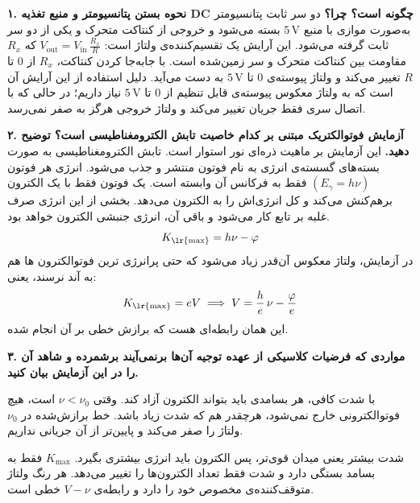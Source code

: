
\noindent\textbf{۱. نحوه بستن پتانسیومتر و منبع تغذیه DC چگونه است؟ چرا؟}
\newline
دو سر ثابت پتانسیومتر به‌صورت موازی با منبع $5\,\mathrm{V}$ بسته می‌شود و
خروجی از کنتاکت متحرک و یکی از دو سر ثابت گرفته می‌شود. این آرایش یک
تقسیم‌کننده‌ی ولتاژ است:
\(V_{\mathrm{out}} = V_{\mathrm{in}}\,\frac{R_x}{R}\)
\newline
که $R_x$ مقاومت بین کنتاکت متحرک و سر زمین‌شده است. با جابه‌جا کردن کنتاکت،
$R_x$ از $0$ تا $R$ تغییر می‌کند و ولتاژ پیوسته‌ی $0$ تا $5\,\mathrm{V}$
به دست می‌آید.
دلیل استفاده از این آرایش آن است که به ولتاژ معکوس پیوسته‌ی قابل تنظیم از
$0$ تا $5\,\mathrm{V}$ نیاز داریم؛ در حالی که با اتصال سری فقط جریان
تغییر می‌کند و ولتاژ خروجی هرگز به صفر نمی‌رسد.

\khat

\noindent\textbf{۲. آزمایش فوتوالکتریک مبتنی بر کدام خاصیت تابش الکترومغناطیسی است؟ توضیح دهید.}
\newline
این آزمایش بر ماهیت ذره‌ای نور استوار است.
تابش الکترومغناطیسی به صورت بسته‌های گسسته‌ی انرژی به نام فوتون منتشر و جذب می‌شود.
انرژی هر فوتون
\((E_{\gamma} = h\nu)\)
فقط به فرکانس آن وابسته است.
\newline
یک فوتون فقط با یک الکترون برهم‌کنش می‌کند و کل انرژی‌اش را به الکترون می‌دهد.
بخشی از این انرژی صرف غلبه بر تابع کار می‌شود و باقی آن، انرژی جنبشی الکترون خواهد بود.
\begin{equation*}
    K_\textrm{\lr{max}} = h \nu - \varphi
\end{equation*}
در آزمایش، ولتاژ معکوس آن‌قدر زیاد می‌شود که حتی پرانرژی ترین فوتو‌الکترون ها هم به آند نرسند، یعنی:
\[K_\textrm{\lr{max}} = eV \implies V = \frac{h}{e}\,\nu - \frac{\varphi}{e}\]
این همان رابطه‌ای هست که برازش خطی بر آن انجام شده.

\khat

\noindent\textbf{۳. مواردی که فرضیات کلاسیکی از عهده توجیه آن‌ها برنمی‌آیند برشمرده و شاهد آن را در این آزمایش بیان کنید.}
\begin{enumerate}[leftmargin=*, itemsep=0.8em]

    {با شدت کافی، هر بسامدی باید بتواند الکترون آزاد کند.}
    {وقتی \(\nu < \nu_0\) است، هیچ فوتوالکترونی خارج نمی‌شود، هرچقدر هم که شدت زیاد باشد.}
    {خط برازش‌شده در \(\nu_0\) ولتاژ را صفر می‌کند و پایین‌تر از آن جریانی نداریم.}

    {شدت بیشتر یعنی میدان قوی‌تر، پس الکترون باید انرژی بیشتری بگیرد.}
    {\(K_{\max}\) فقط به بسامد بستگی دارد و شدت فقط تعداد الکترون‌ها را تغییر می‌دهد.}
    {هر رنگ ولتاژ متوقف‌کننده‌ی مخصوص خود را دارد و رابطه‌ی \(V-\nu\) خطی است.}

\end{enumerate}

